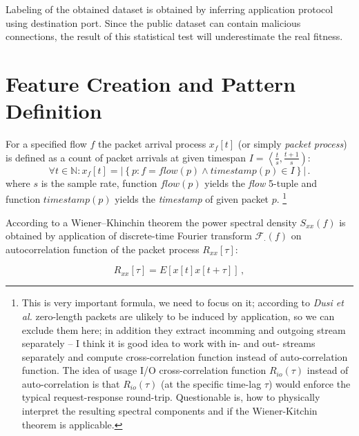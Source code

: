 Labeling of the obtained dataset is obtained by inferring application 
protocol using destination port.
Since the public dataset can contain malicious connections, 
the result of this statistical test will underestimate the real fitness.

\section{Feature Creation and Pattern Definition}
For a specified flow $f$ the packet arrival process $x_f\left[t\right]$ 
(or simply \emph{packet process})  is defined as a count of packet arrivals 
at given timespan $I = \left\langle \frac{t}{s}, \frac{t+1}{s} \right)$:
\begin{equation}\label{packetprocess}
	 \forall t \in \mathbb{N} : x_f\left[t\right] = \left| 
	\left\lbrace p : f = flow(p) \wedge timestamp(p) \in I \right\rbrace \right|\, .
\end{equation}
where $s$ is the sample rate, function $flow(p)$  yields the \emph{flow} 5-tuple 
and function $timestamp(p)$  yields the \emph{timestamp} of given packet $p$. 
\footnote{
This is very important formula, we need to focus on it; according 
to \emph{Dusi et al.} \cite{dusi2009tunnel}
zero-length packets are ulikely to be induced by application, 
so we can exclude them here; in addition
they extract incomming and outgoing  stream separately -- 
I think it is good idea to work with in- and out- streams separately 
and compute cross-correlation function instead of auto-correlation function.
The idea of usage I/O cross-correlation function $R_{io}\left(\tau\right)$ 
instead of auto-correlation is that $R_{io}\left(\tau\right)$ (at the specific 
time-lag $\tau$) would enforce the typical request-response round-trip. 
Questionable is, how to physically interpret the resulting spectral components 
and if the Wiener-Kitchin theorem is applicable.
}

According to a Wiener–Khinchin %
theorem the power spectral density $S_{xx}(f)$ is obtained by application of discrete-time 
Fourier transform $\mathcal{F}_{\cdot}(f)$ on autocorrelation function 
of the packet process $R_{xx}\left[\tau\right]$:

\begin{equation}\label{eq:corr}
R_{xx}\left[\tau\right] = E[x\left[t\right]x\left[t+\tau\right]]\, , 
\end{equation}

